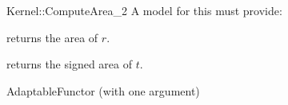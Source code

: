 \begin{ccRefFunctionObjectConcept}{Kernel::ComputeArea_2}
A model for this must provide:


       {returns the area of $r$. }

       {returns the signed area of $t$. }

\ccRefines
AdaptableFunctor (with one argument)

\ccSeeAlso
{} \\
  \\

\end{ccRefFunctionObjectConcept}
